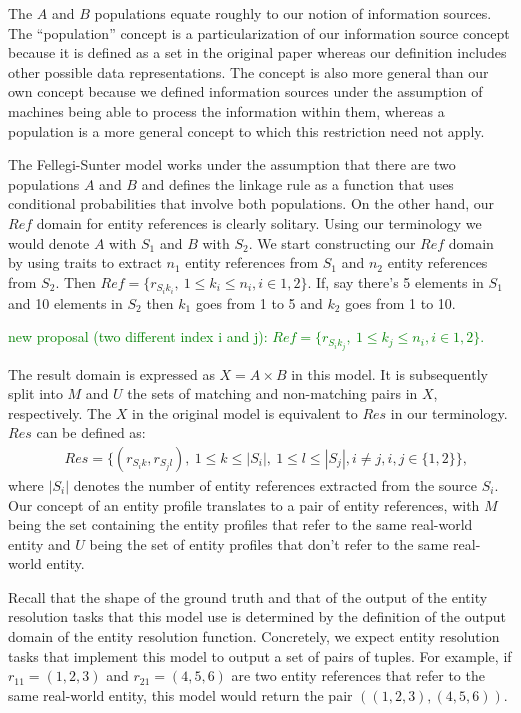 \documentclass[lettersize,journal]{IEEEtran}
\begin{document}
    The $A$ and $B$ populations equate roughly to our notion of information
    sources.
    The ``population'' concept is a particularization of our information source
    concept because it is defined as a set in the original paper whereas our
    definition includes other possible data representations.
    The concept is also more general than our own concept because we defined
    information sources under the assumption of machines being able to process
    the information within them, whereas a population is a more general concept
    to which this restriction need not apply.

    The Fellegi-Sunter model works under the assumption that there are two
    populations $A$ and $B$ and defines the linkage rule as a function that uses
    conditional probabilities that involve both populations.
    On the other hand, our $Ref$ domain for entity references is clearly
    solitary.
    Using our terminology we would denote $A$ with $S_1$ and $B$ with $S_2$.
    We start constructing our $Ref$ domain by using traits to extract $n_1$
    entity references from $S_1$ and $n_2$ entity references from $S_2$.
    Then $Ref = \{r_{{S_i}{k_i}},~1 \leq k_i \leq n_i, i \in {1, 2} \}$.
    If, say there's 5 elements in $S_1$ and 10 elements in $S_2$ then $k_1$ goes
    from 1 to 5 and $k_2$ goes from 1 to 10.

    \textcolor{green}{new proposal (two different index i and j):  $Ref = \{r_{{S_i}{k_j}},~1 \leq k_j \leq n_i, i \in {1, 2} \}$.}
    
    The result domain is expressed as $X = A \times B$ in this model.
    It is subsequently split into $M$ and $U$ the sets of matching and
    non-matching pairs in $X$, respectively.
    The $X$ in the original model is equivalent to $Res$ in our terminology.
    $Res$ can be defined as:
    \begin{align}
        &Res = \{(r_{{S_i}{k}}, r_{{S_j}{l}}),~1 \leq k \leq |S_i|,~1
        \leq l \leq |S_j|, i \neq j, i,j \in \{1, 2\}\}\textrm{,}\nonumber
    \end{align}
    where $|S_i|$ denotes the number of entity references extracted from the
    source $S_i$.
    Our concept of an entity profile translates to a pair of entity references,
    with $M$ being the set containing the entity profiles that refer to the same
    real-world entity and $U$ being the set of entity profiles that don't refer
    to the same real-world entity.

    Recall that the shape of the ground truth and that of the output of the
    entity resolution tasks that this model use is determined by the definition
    of the output domain of the entity resolution function.
    Concretely, we expect entity resolution tasks that implement this model to
    output a set of pairs of tuples.
    For example, if $r_{11}=(1, 2, 3)$ and $r_{21}=(4, 5, 6)$ are two entity
    references that refer to the same real-world entity, this model would return
    the pair $((1, 2, 3), (4, 5, 6))$.
\end{document}
